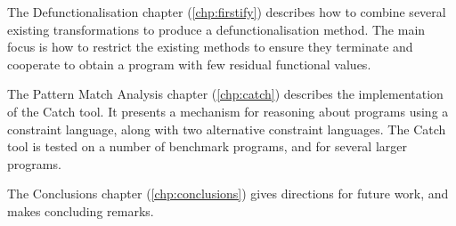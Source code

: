 The Defunctionalisation chapter (\ref{chp:firstify}) describes how to combine several existing transformations to produce a defunctionalisation method. The main focus is how to restrict the existing methods to ensure they terminate and cooperate to obtain a program with few residual functional values.

The Pattern Match Analysis chapter (\ref{chp:catch}) describes the implementation of the Catch tool. It presents a mechanism for reasoning about programs using a constraint language, along with two alternative constraint languages. The Catch tool is tested on a number of benchmark programs, and for several larger programs.

The Conclusions chapter (\ref{chp:conclusions}) gives directions for future work, and makes concluding remarks.

